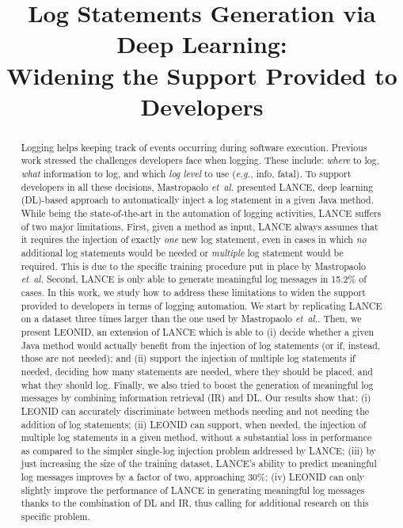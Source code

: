 \documentclass[10pt,conference]{IEEEtran}
\newcommand{\eg}{\emph{e.g.,}\xspace}
\newcommand{\etal}{\emph{et~al.}\xspace}
\newcommand{\approach}{LEONID\xspace} %
\begin{document}
\title{Log Statements Generation via Deep Learning:\\Widening the Support Provided to Developers}


\maketitle

\begin{abstract}
Logging helps keeping track of events occurring during software execution. Previous work stressed the challenges developers face when logging. These include: \emph{where} to log, \emph{what} information to log, and which \emph{log level} to use (\eg info, fatal). To support developers in all these decisions, Mastropaolo \etal presented LANCE, deep learning (DL)-based approach to automatically inject a log statement in a given Java method. While being the state-of-the-art in the automation of logging activities, LANCE suffers of two major limitations. First, given a method as input, LANCE always assumes that it requires the injection of exactly \emph{one} new log statement, even in cases in which \emph{no} additional log statements would be needed or \emph{multiple} log statement would be required. This is due to the specific training procedure put in place by Mastropaolo \etal Second, LANCE is only able to generate meaningful log messages in 15.2\% of cases. In this work, we study how to address these limitations to widen the support provided to developers in terms of logging automation. We start by replicating LANCE on a dataset three times larger than the one used by Mastropaolo \etal. Then, we present \approach, an extension of LANCE which is able to (i) decide whether a given Java method would actually benefit from the injection of log statements (or if, instead, those are not needed); and (ii) support the injection of multiple log statements if needed, deciding how many statements are needed, where they should be placed, and what they should log. Finally, we also tried to boost the generation of meaningful log messages by combining information retrieval (IR) and DL. Our results show that: (i) \approach can accurately discriminate between methods needing and not needing the addition of log statements; (ii) \approach can support, when needed, the injection of multiple log statements in a given method, without a substantial loss in performance as compared to the simpler single-log injection problem addressed by LANCE; (iii) by just increasing the size of the training dataset, LANCE's ability to predict meaningful log messages improves by a factor of two, approaching 30\%; (iv) \approach can only slightly improve the performance of LANCE in generating meaningful log messages thanks to the combination of DL and IR, thus calling for additional research on this specific problem.
\end{abstract}
\end{document}
